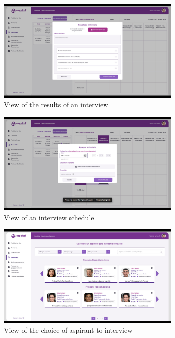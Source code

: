 \documentclass{scrreprt}
\begin{document}
\begin{figure}[H]
	\centering \small
	\includegraphics[width=0.8\textwidth]{WebPrototype/wflow-30.jpeg}
	\caption{View of the results of an interview}
\end{figure}

\begin{figure}[H]
	\centering \small
	\includegraphics[width=0.8\textwidth]{WebPrototype/wflow-31-2.jpg}
	\caption{View of an interview schedule}
\end{figure}

\begin{figure}[H]
	\centering \small
	\includegraphics[width=0.8\textwidth]{WebPrototype/wflow-31.jpeg}
	\caption{View of the choice of aspirant to interview}
\end{figure}
\end{document}
